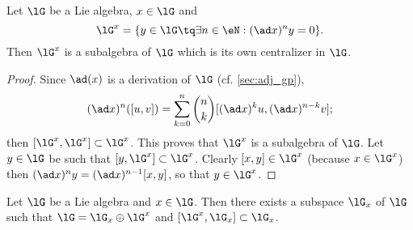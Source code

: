 \begin{proposition}\label{prop:G_x_central}
    Let $\lG$ be a Lie algebra, $x\in\lG$ and
        \begin{equation}
            \lG^x=\{y\in\lG\tq\exists n\in\eN:(\ad x)^ny=0\}.
        \end{equation}
    Then $\lG^x$ is a subalgebra of $\lG$ which is its own centralizer in $\lG$.
\end{proposition}

\begin{proof}
Since $\ad(x)$ is a derivation of $\lG$ (cf. \ref{sec:adj_gp}),
\[
(\ad x)^n([u,v])=\sum_{k=0}^n \binom{n}{k} [ (\ad x)^ku,(\ad x)^{n-k}v ];
\]
then $[\lG^x,\lG^x]\subset\lG^x$. This proves that $\lG^x$ is a subalgebra of $\lG$. Let $y\in\lG$ be such that $[y,\lG^x]\subset\lG^x$. Clearly $[x,y]\in\lG^x$ (because $x\in\lG^x$) then $(\ad x)^ny=(\ad x)^{n-1}[x,y]$, so that $y\in\lG^x$.
\end{proof}

\begin{proposition}
Let $\lG$ be a Lie algebra and $x\in\lG$. Then there exists a subspace $\lG_x$ of $\lG$ such that $\lG=\lG_x\oplus\lG^x$ and $[\lG^x,\lG_x]\subset\lG_x$.
\label{prop:G_x_G_x}
\end{proposition}

